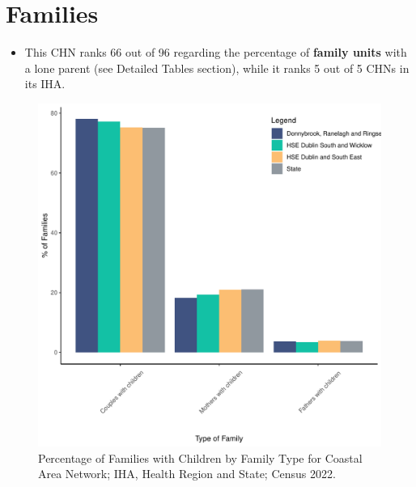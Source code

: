 \documentclass{article}
\begin{document}
\section{Families}\label{sect:Fam}
\begin{itemize}
\item This CHN ranks  66 out of 96 regarding the percentage of \textbf{family units} with a lone parent (see Detailed Tables section), while it ranks   5 out of 5 CHNs in its IHA.
\end{itemize}
\begin{figure}[H]
	\centering
	\includegraphics[width = 150mm]{../figures/FamED.pdf}
	\caption{Percentage of Families with Children by Family Type for Coastal Area Network; IHA, Health Region and State; Census 2022.}
	\label{fig:vbnv}
	\end{figure}
	
\end{document}
